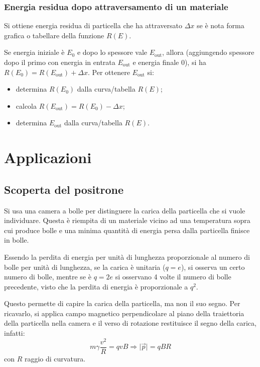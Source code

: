 \documentclass[10pt, a4paper]{scrartcl}
\numberwithin{equation}{subsection}
\theoremstyle{style1}
\begin{document}
\begin{center}
\begin{minipage}{.45\columnwidth}
	\end{minipage}
\end{center}



\subsubsection{Energia residua dopo attraversamento di un materiale}
Si ottiene energia residua di particella che ha attraversato $\Delta x$ se \`e nota forma grafica o tabellare della funzione $R(E)$.

Se energia iniziale \`e $E_0$ e dopo lo spessore vale $E_\text{out}$, allora (aggiungendo spessore dopo il primo con energia in entrata $E_\text{out}$ e energia finale $0$), si ha $R(E_0) = R(E_\text{out}) + \Delta x$. Per ottenere $E_\text{out}$ si:
\begin{itemize}
	\item determina $R(E_0)$ dalla curva/tabella $R(E)$;
	\item calcola $R(E_\text{out}) = R(E_0) - \Delta x$;
	\item determina $E_\text{out}$ dalla curva/tabella $R(E)$.
\end{itemize}

\newpage
\section{Applicazioni}
\subsection{Scoperta del positrone}
Si usa una camera a bolle per distinguere la carica della particella che si vuole individuare. Questa \`e riempita di un materiale vicino ad una temperatura sopra cui produce bolle e una minima quantit\`a di energia persa dalla particella finisce in bolle. 

Essendo la perdita di energia per unit\`a di lunghezza proporzionale al numero di bolle per unit\`a di lunghezza, se la carica \`e unitaria ($q = e$), si osserva un certo numero di bolle, mentre se \`e $q=2e$ si osservano 4 volte il numero di bolle precedente, visto che la perdita di energia \`e proporzionale a $q^2$.

Questo permette di capire la carica della particella, ma non il suo segno. Per ricavarlo, si applica campo magnetico perpendicolare al piano della traiettoria della particella nella camera e il verso di rotazione restituisce il segno della carica, infatti:
\[
m\gamma \frac{v^2}{R} = qvB \Rightarrow  \lvert \vec{p} \rvert  = qBR
\] 
con $R$ raggio di curvatura.
\end{document}
